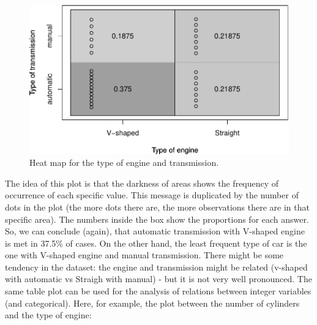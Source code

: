 \documentclass[
]{book}
\newenvironment{Shaded}{\begin{snugshade}}{\end{snugshade}}
\newcommand{\DataTypeTok}[1]{\textcolor[rgb]{0.13,0.29,0.53}{#1}}
\newcommand{\KeywordTok}[1]{\textcolor[rgb]{0.13,0.29,0.53}{\textbf{#1}}}
\newcommand{\NormalTok}[1]{#1}
\newcommand{\OperatorTok}[1]{\textcolor[rgb]{0.81,0.36,0.00}{\textbf{#1}}}
\newcommand{\StringTok}[1]{\textcolor[rgb]{0.31,0.60,0.02}{#1}}
\theoremstyle{definition}
\theoremstyle{definition}
\theoremstyle{definition}
\theoremstyle{definition}
\theoremstyle{remark}
\begin{document}
\begin{figure}
\centering
\includegraphics{Svetunkov---Statistics-for-Business-Analytics_files/figure-latex/tableplotVSAM-1.pdf}
\caption{\label{fig:tableplotVSAM}Heat map for the type of engine and transmission.}
\end{figure}

The idea of this plot is that the darkness of areas shows the frequency of occurrence of each specific value. This message is duplicated by the number of dots in the plot (the more dots there are, the more observations there are in that specific area). The numbers inside the box show the proportions for each answer. So, we can conclude (again), that automatic transmission with V-shaped engine is met in 37.5\% of cases. On the other hand, the least frequent type of car is the one with V-shaped engine and manual transmission. There might be some tendency in the dataset: the engine and transmission might be related (v-shaped with automatic vs Straigh with manual) - but it is not very well pronounced. The same table plot can be used for the analysis of relations between integer variables (and categorical). Here, for example, the plot between the number of cylinders and the type of engine:

\begin{Shaded}
\end{Shaded}
\end{document}
